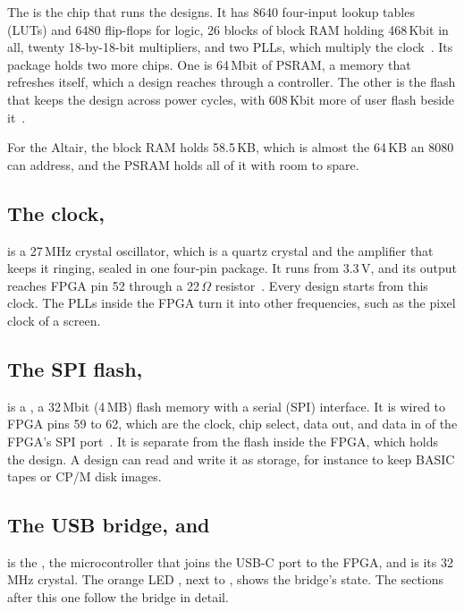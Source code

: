 \documentclass[11pt,a4paper]{article}
\begin{document}
The  is the chip that runs the designs. It has 8640 four-input lookup tables (LUTs) and 6480 flip-flops for logic, 26 blocks of block RAM holding 468\,Kbit in all, twenty 18-by-18-bit multipliers, and two PLLs, which multiply the clock~\cite[p.~1]{tnds}. Its package holds two more chips. One is 64\,Mbit of PSRAM, a memory that refreshes itself, which a design reaches through a controller. The other is the flash that keeps the design across power cycles, with 608\,Kbit more of user flash beside it~\cite[p.~1]{tnds}.

For the Altair, the block RAM holds 58.5\,KB, which is almost the 64\,KB an 8080 can address, and the PSRAM holds all of it with room to spare.

\subsection*{The clock, }

 is a 27\,MHz crystal oscillator, which is a quartz crystal and the amplifier that keeps it ringing, sealed in one four-pin package. It runs from 3.3\,V, and its output reaches FPGA pin 52 through a 22\,$\Omega$ resistor~\cite[p.~2]{schematic}. Every design starts from this clock. The PLLs inside the FPGA turn it into other frequencies, such as the pixel clock of a screen.

\subsection*{The SPI flash, }

 is a , a 32\,Mbit (4\,MB) flash memory with a serial (SPI) interface. It is wired to FPGA pins 59 to 62, which are the clock, chip select, data out, and data in of the FPGA’s SPI port~\cite[p.~2]{schematic}. It is separate from the flash inside the FPGA, which holds the design. A design can read and write it as storage, for instance to keep BASIC tapes or CP/M disk images.

\subsection*{The USB bridge,  and }

 is the , the microcontroller that joins the USB-C port to the FPGA, and  is its 32\,MHz crystal. The orange LED , next to , shows the bridge’s state. The sections after this one follow the bridge in detail.
\end{document}
